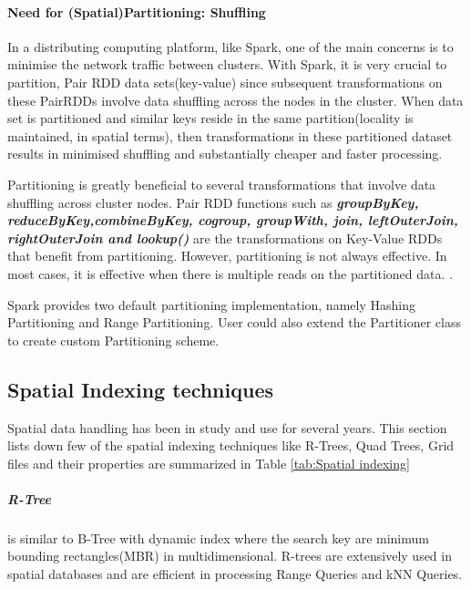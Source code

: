 \documentclass[article,type=msc,colorback,12pt,accentcolor=tud1d]{tudthesis}
\begin{document}
		    
		    
		   \paragraph{Need for (Spatial)Partitioning: Shuffling}
		   
		   In a distributing computing platform, like Spark, one of the main concerns is to minimise the network traffic between clusters. With Spark, it is very crucial to partition, Pair RDD\cite{sparkKV} data sets(key-value) since subsequent transformations on these PairRDDs involve data shuffling across the nodes in the cluster. When data set is partitioned and similar keys reside in the same partition(locality is maintained, in spatial terms), then transformations in these partitioned dataset results in minimised shuffling and substantially cheaper and faster processing.  
		   
		   Partitioning is greatly beneficial to several transformations that involve data shuffling across cluster nodes. Pair RDD functions\cite{sparkPairRDDFunctions} such as \textbf{\textit{groupByKey, reduceByKey,combineByKey, cogroup, groupWith, join, leftOuterJoin, rightOuterJoin and lookup()}} are the transformations on Key-Value RDDs that benefit from partitioning. However, partitioning is not always effective. In most cases, it is effective when there is multiple reads on the partitioned data. \cite{sparkbook}.
		   
		   Spark provides two default partitioning implementation, namely Hashing Partitioning and Range Partitioning. User could also extend the Partitioner class to create custom Partitioning scheme. 
		   
		   
		   \hfill
		   \subsection{Spatial Indexing techniques}
		   
		   Spatial data handling has been in study and use for several years. This section lists down few of the spatial indexing techniques like R-Trees, Quad Trees, Grid files and their properties are summarized in Table \ref{tab:Spatial indexing}
		   
		   \subparagraph{R-Tree} is similar to B-Tree with dynamic index where the search key are minimum bounding rectangles(MBR) in multidimensional. R-trees are extensively used in spatial databases and are efficient in processing Range Queries and kNN Queries.
		   
\end{document}

